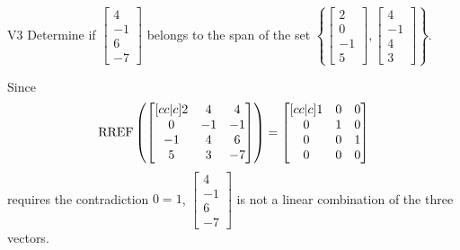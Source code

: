 \begin{problem}{V3}
  Determine if
  \(\begin{bmatrix} 4 \\ -1 \\ 6 \\ -7 \end{bmatrix}\)
  belongs to the span of the set
  \(\left\{
    \begin{bmatrix} 2 \\ 0 \\ -1 \\ 5 \end{bmatrix},
    \begin{bmatrix} 4 \\ -1 \\ 4 \\ 3 \end{bmatrix}
    \right\}
  \).
\end{problem}
\begin{solution}
  Since
  \[
    \operatorname{RREF}\left(
      \begin{bmatrix}[cc|c]
        2 & 4 & 4 \\
        0 & -1 & -1 \\
        -1 & 4 & 6 \\
        5 & 3 & -7
      \end{bmatrix}
    \right) =
    \begin{bmatrix}[cc|c]
      1 & 0 & 0 \\
      0 & 1 & 0 \\
      0 & 0 & 1 \\
      0 & 0 & 0
    \end{bmatrix}
  \]
  requires the contradiction \(0=1\),
  \(\begin{bmatrix} 4 \\ -1 \\ 6 \\ -7 \end{bmatrix}\) is
  not a linear combination of the three vectors.
\end{solution}


